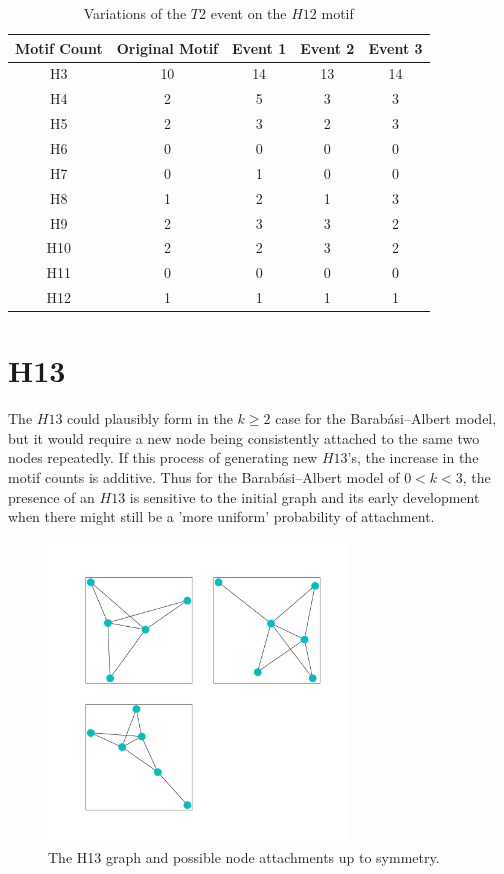 \begin{table}
    \centering
    \begin{tabular}{||c c c c c||} 
    \hline
    Motif Count & Original Motif & Event 1 & Event 2 & Event 3 \\ [0.5ex] 
    \hline\hline
    H3 & 10 & 14 & 13 & 14\\ 
    \hline
    H4 & 2 & 5 & 3 & 3 \\
    \hline
    H5 & 2 & 3 & 2 & 3 \\
    \hline
    H6 & 0 & 0 & 0 & 0 \\
    \hline
    H7 & 0 & 1 & 0 & 0 \\
    \hline
    H8 & 1 & 2 & 1 & 3\\
    \hline
    H9 & 2 & 3 & 3 & 2 \\
    \hline
    H10 & 2 & 2 & 3 & 2 \\
    \hline
    H11 & 0 & 0 & 0 & 0 \\
    \hline
    H12 & 1 & 1 & 1 & 1\\
    \hline
   \end{tabular}
   \caption{Variations of the $T2$ event on the $H12$ motif}
   \label{table:10}
\end{table}


\FloatBarrier

\section{H13}
The $H13$ could plausibly form in the $k \geq 2$ case for the 
Barabási–Albert model, but it would require a new node being consistently attached to the
same two nodes repeatedly. If this process of generating new $H13$'s, the increase in the motif counts is additive.
 Thus for the Barabási–Albert model of $0<k<3$, the presence of an $H13$ is sensitive
to the initial graph and its early development when there might still be a 'more uniform' probability
of attachment.

\begin{figure}[!ht]
    \includegraphics[width=8cm]{Images/H13_evolution.png}
    \centering
    \caption{The H13 graph and possible node attachments up to symmetry.}
\end{figure}

